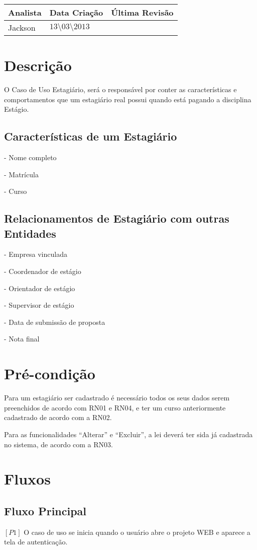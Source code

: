 
\begin{tabular}{|p{4cm}|p{4cm}|p{4cm}|}
\hline
\textbf{Analista} &\textbf{Data Criação} &\textbf{Última Revisão}\\
\hline
Jackson &$13\setminus03\setminus2013$ &\\
\hline
\end{tabular}

\section{Descrição}
O Caso de Uso Estagiário, será o responsável por conter as características e comportamentos
que um estagiário real possui quando está pagando a disciplina Estágio.

\subsection{Características de um Estagiário}
- Nome completo

- Matrícula

- Curso

\subsection{Relacionamentos de Estagiário com outras Entidades}

- Empresa vinculada

- Coordenador de estágio

- Orientador de estágio

- Supervisor de estágio

- Data de submissão de proposta

- Nota final

\section{Pré-condição}
Para um estagiário ser cadastrado é necessário todos os seus dados serem preenchidos de
acordo com RN01 e RN04, e ter um curso anteriormente cadastrado de acordo com a RN02.

Para as funcionalidades “Alterar” e “Excluir”, a lei deverá ter sida já cadastrada no sistema,
de acordo com a RN03.

\section{Fluxos}

\subsection{Fluxo Principal}
\textbf{$[P1]$} O caso de uso se inicia quando o usuário abre o projeto WEB e aparece a tela de autenticação.

